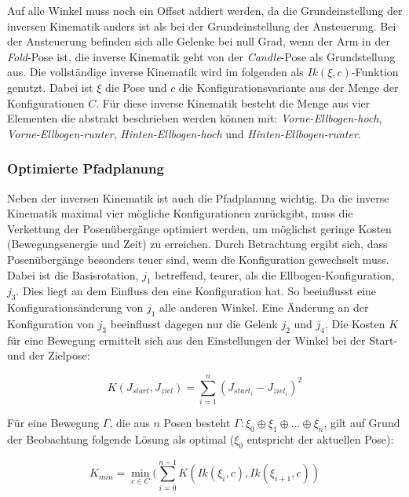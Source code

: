Auf alle Winkel muss noch ein Offset addiert werden, da die Grundeinstellung der inversen Kinematik anders ist als bei der Grundeinstellung der Ansteuerung. Bei der Ansteuerung befinden sich alle Gelenke bei null Grad, wenn der Arm in der \textit{Fold}-Pose ist, die inverse Kinematik geht von der \textit{Candle}-Pose als Grundstellung aus. Die vollständige inverse Kinematik wird im folgenden als $Ik(\xi, c)$-Funktion genutzt. Dabei ist $\xi$ die Pose und $c$ die Konfigurationsvariante aus der Menge der Konfigurationen $C$. Für diese inverse Kinematik besteht die Menge aus vier Elementen die abstrakt beschrieben werden können mit: \textit{Vorne-Ellbogen-hoch}, \textit{Vorne-Ellbogen-runter}, \textit{Hinten-Ellbogen-hoch} und \textit{Hinten-Ellbogen-runter}.

\subsubsection{Optimierte Pfadplanung}
Neben der inversen Kinematik ist auch die Pfadplanung wichtig. Da die inverse Kinematik maximal vier mögliche Konfigurationen zurückgibt, muss die Verkettung der Posenübergänge optimiert werden, um möglichst geringe Kosten (Bewegungsenergie und Zeit) zu erreichen. Durch Betrachtung ergibt sich, dass Posenübergänge besonders teuer sind, wenn die Konfiguration gewechselt muss. Dabei ist die Basisrotation, $j_1$ betreffend, teurer, als die Ellbogen-Konfiguration, $j_3$. Dies liegt an dem Einfluss den eine Konfiguration hat. So beeinflusst eine Konfigurationsänderung von $j_1$ alle anderen Winkel. Eine Änderung an der Konfiguration von $j_3$ beeinflusst dagegen nur die Gelenk $j_2$ und $j_4$. Die Kosten $K$ für eine Bewegung ermittelt sich aus den Einstellungen der Winkel bei der Start- und der Zielpose:

\begin{equation}
K(J_{start}, J_{ziel}) = \sum_{i=1}^{n} (J_{start_i} - J_{ziel_i})^2
\label{eq:36}
\end{equation}

Für eine Bewegung $\Gamma$, die aus $n$ Posen besteht $\Gamma: \xi_0 \oplus \xi_1 \oplus ... \oplus \xi_n$, gilt auf Grund der Beobachtung folgende Lösung als optimal ($\xi_0$ entspricht der aktuellen Pose):

\begin{equation}
K_{min} = \min_{c \in C}(\sum_{i=0}^{n-1} K(Ik(\xi_i, c), Ik(\xi_{i+1}, c))
\label{eq:37}
\end{equation}

